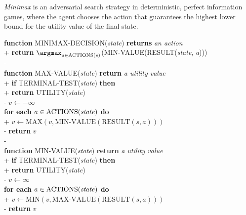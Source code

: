 \documentclass{article}
\begin{document}
\begin{definition}
    \emph{Minimax} is an adversarial search strategy in deterministic, perfect
    information games, where the agent chooses the action that guarantees the
    highest lower bound for the utility value of the final state.

    \begin{pseudo}
        \textbf{function} MINIMAX-DECISION(\emph{state}) \textbf{returns} \emph{an action}\\+
            \textbf{return} $\argmax_{a\in\text{ACTIONS}(s)}$(MIN-VALUE(RESULT(\emph{state}, \emph{a})))\\-
        \\
        \textbf{function} MAX-VALUE(\emph{state}) \textbf{return} \emph{a utility value}\\+
            \textbf{if} TERMINAL-TEST(\emph{state}) \textbf{then}\\+
                \textbf{return} UTILITY(\emph{state})\\-
            $v\leftarrow-\infty$\\
            \textbf{for each} $a\in\text{ACTIONS(\emph{state})}$ \textbf{do}\\+
                $v\leftarrow \text{MAX}(v, \text{MIN-VALUE}(\text{RESULT}(s, a)))$\\-
            \textbf{return} $v$\\-
        \\
        \textbf{function} MIN-VALUE(\emph{state}) \textbf{return} \emph{a utility value}\\+
            \textbf{if} TERMINAL-TEST(\emph{state}) \textbf{then}\\+
                \textbf{return} UTILITY(\emph{state})\\-
            $v\leftarrow\infty$\\
            \textbf{for each} $a\in\text{ACTIONS(\emph{state})}$ \textbf{do}\\+
                $v\leftarrow \text{MIN}(v, \text{MAX-VALUE}(\text{RESULT}(s, a)))$\\-
            \textbf{return} $v$
    \end{pseudo}
\end{definition}
\end{document}
